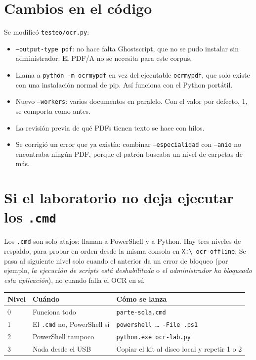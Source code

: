 ﻿\documentclass[11pt,a4paper]{article}
\begin{document}
\section{Cambios en el código}

Se modificó \texttt{testeo/ocr.py}:

\begin{itemize}
  \item \texttt{--output-type pdf}: no hace falta Ghostscript, que no se pudo instalar sin
        administrador. El PDF/A no se necesita para este corpus.
  \item Llama a \texttt{python -m ocrmypdf} en vez del ejecutable \texttt{ocrmypdf}, que
        solo existe con una instalación normal de pip. Así funciona con el Python portátil.
  \item Nuevo \texttt{--workers}: varios documentos en paralelo. Con el valor por defecto,
        1, se comporta como antes.
  \item La revisión previa de qué PDFs tienen texto se hace con hilos.
  \item Se corrigió un error que ya existía: combinar \texttt{--especialidad} con
        \texttt{--anio} no encontraba ningún PDF, porque el patrón buscaba un nivel de
        carpetas de más.
\end{itemize}

\section{Si el laboratorio no deja ejecutar los \texttt{.cmd}}

Los \texttt{.cmd} son solo atajos: llaman a PowerShell y a Python. Hay tres niveles de
respaldo, para probar en orden desde la misma consola en \texttt{X:\textbackslash
ocr-offline}. Se pasa al siguiente nivel solo cuando el anterior da un error de bloqueo
(por ejemplo, \emph{la ejecución de scripts está deshabilitada} o \emph{el administrador
ha bloqueado esta aplicación}), no cuando falla el OCR en sí.

\begin{center}
\begin{tabular}{lp{4.6cm}p{5.6cm}}
\toprule
Nivel & Cuándo & Cómo se lanza \\
\midrule
0 & Funciona todo & \texttt{parte-sola.cmd} \\
1 & El \texttt{.cmd} no, PowerShell sí & \texttt{powershell \ldots\ -File .ps1} \\
2 & PowerShell tampoco & \texttt{python.exe ocr-lab.py} \\
3 & Nada desde el USB & Copiar el kit al disco local y repetir 1 o 2 \\
\bottomrule
\end{tabular}
\end{center}
\end{document}
